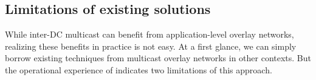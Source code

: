 
%
%
%
%

\subsection{Limitations of existing solutions}
\label{subsec:motivation:baseline}

While inter-DC multicast can benefit from application-level overlay networks,
realizing these benefits in practice
is not easy. At a first glance, we can simply borrow existing techniques
from multicast overlay networks in other contexts.
But the operational experience of \company indicates
two limitations of this approach.

